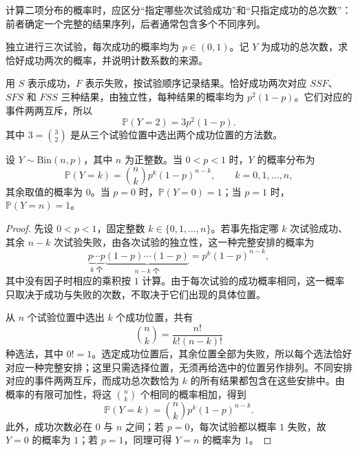 计算二项分布的概率时，应区分“指定哪些次试验成功”和“只指定成功的总次数”：前者确定一个完整的结果序列，后者通常包含多个不同序列。

\begin{example}
\label{ex:study-binomial-three-trials}
独立进行三次试验，每次成功的概率均为 $p\in(0,1)$。记 $Y$ 为成功的总次数，求恰好成功两次的概率，并说明计数系数的来源。
\end{example}

\begin{solve}
用 $S$ 表示成功，$F$ 表示失败，按试验顺序记录结果。恰好成功两次对应 $SSF$、$SFS$ 和 $FSS$ 三种结果，由独立性，每种结果的概率均为 $p^2(1-p)$。它们对应的事件两两互斥，所以
\begin{equation}
  \mathbb P(Y=2)=3p^2(1-p).
  \label{eq:study-binomial-three-trials}
\end{equation}
其中 $3=\binom32$ 是从三个试验位置中选出两个成功位置的方法数。
\end{solve}

\begin{proposition}
\label{prop:study-binomial-mass}
设 $Y\sim\mathrm{Bin}(n,p)$，其中 $n$ 为正整数。当 $0<p<1$ 时，$Y$ 的概率分布为
\begin{equation}
  \mathbb P(Y=k)=\binom nk p^k(1-p)^{n-k},
  \qquad k=0,1,\ldots,n,
  \label{eq:study-binomial-mass}
\end{equation}
其余取值的概率为 $0$。当 $p=0$ 时，$\mathbb P(Y=0)=1$；当 $p=1$ 时，$\mathbb P(Y=n)=1$。
\end{proposition}

\begin{proof}
先设 $0<p<1$，固定整数 $k\in\{0,1,\ldots,n\}$。若事先指定哪 $k$ 次试验成功、其余 $n-k$ 次试验失败，由各次试验的独立性，这一种完整安排的概率为
\[
  \underbrace{p\cdots p}_{k\text{ 个}}
  \underbrace{(1-p)\cdots(1-p)}_{n-k\text{ 个}}
  =p^k(1-p)^{n-k},
\]
其中没有因子时相应的乘积按 $1$ 计算。由于每次试验的成功概率相同，这一概率只取决于成功与失败的次数，不取决于它们出现的具体位置。

从 $n$ 个试验位置中选出 $k$ 个成功位置，共有
\[
  \binom nk=\frac{n!}{k!(n-k)!}
\]
种选法，其中 $0!=1$。选定成功位置后，其余位置全部为失败，所以每个选法恰好对应一种完整安排；这里只需选择位置，无须再给选中的位置另作排列。不同安排对应的事件两两互斥，而成功总次数恰为 $k$ 的所有结果都包含在这些安排中。由概率的有限可加性，将这 $\binom nk$ 个相同的概率相加，得到
\[
  \mathbb P(Y=k)=\binom nk p^k(1-p)^{n-k}.
\]
此外，成功次数必在 $0$ 与 $n$ 之间；若 $p=0$，每次试验都以概率 $1$ 失败，故 $Y=0$ 的概率为 $1$；若 $p=1$，同理可得 $Y=n$ 的概率为 $1$。
\end{proof}

